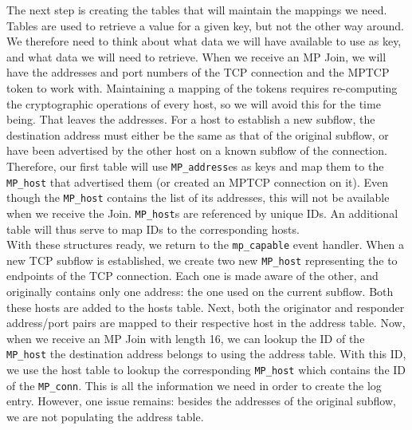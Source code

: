 The next step is creating the tables that will maintain the mappings we need. Tables are used to retrieve a value for a given key, but not the other way around. We therefore need to think about what data we will have available to use as key, and what data we will need to retrieve. When we receive an MP Join, we will have the addresses and port numbers of the TCP connection and the MPTCP token to work with. Maintaining a mapping of the tokens requires re-computing the cryptographic operations of every host, so we will avoid this for the time being. That leaves the addresses. For a host to establish a new subflow, the destination address must either be the same as that of the original subflow, or have been advertised by the other host on a known subflow of the connection. Therefore, our first table will use \texttt{MP\_address}es as keys and map them to the \texttt{MP\_host} that advertised them (or created an MPTCP connection on it). Even though the \texttt{MP\_host} contains the list of its addresses, this will not be available when we receive the Join. \texttt{MP\_host}s are referenced by unique IDs. An additional table will thus serve to map IDs to the corresponding hosts.\\

With these structures ready, we return to the \texttt{mp\_capable} event handler. When a new TCP subflow is established, we create two new \texttt{MP\_host} representing the to endpoints of the TCP connection. Each one is made aware of the other, and originally contains only one address: the one used on the current subflow. Both these hosts are added to the hosts table. Next, both the originator and responder address/port pairs are mapped to their respective host in the address table. Now, when we receive an MP Join with length 16, we can lookup the ID of the \texttt{MP\_host} the destination address belongs to using the address table. With this ID, we use the host table to lookup the corresponding \texttt{MP\_host} which contains the ID of the \texttt{MP\_conn}. This is all the information we need in order to create the log entry. However, one issue remains: besides the addresses of the original subflow, we are not populating the address table. \\

